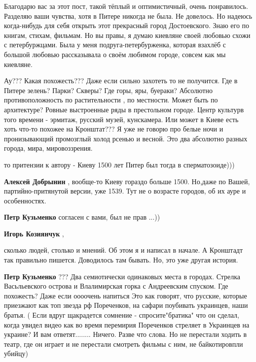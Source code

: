 \begin{itemize}
\begin{itemize}
\end{itemize} %


Благодарю вас за этот пост, такой тёплый и оптимистичный, очень понравилось.
Разделяю ваши чувства, хотя в Питере никогда не была. Не довелось. Но надеюсь
когда-нибудь для себя открыть этот прекрасный город Достоевского. Знаю его по
книгам, стихам, фильмам. Но вы правы, я думаю киевляне своей любовью схожи с
петербуржцами. Была у меня подруга-петербурженка, которая взахлёб с большой
любовью рассказывала о своём любимом городе, совсем как мы киевляне.


Ау??? Какая похожесть??? Даже если сильно захотеть то не получится. Где в
Питере зелень? Парки? Скверы? Где горы, яры, буераки? Абсолютно
противоположность по растительности , по местности. Может быть по архитектуре?
Ровные выстроенные ряды в престольном городе. Центр культурв того времени -
эрмитаж, русский музей, кунскамера. Или может в Киеве есть хоть что-то похожее
на Кронштат??? Я уже не говорю про белые ночи и пронизывающий промозглый холод
рсенью и весной. Это два абсолютно разных города, мира, мировоззрения.

\begin{itemize} %
то притензии к автору - Киеву 1500 лет Питер был тогда в сперматозоиде)))

\begin{itemize} %
\textbf{Алексей Добрынин} , вообще-то Киеву гораздо больше 1500. Но,даже по Вашей, партийно-притянутой версии, уже 1539. Тут не о возрасте городов, об их ауре и особенностях.

\textbf{Петр Кузьменко} согласен с вами, был не прав ...))
\end{itemize} %

\textbf{Игорь Козиянчук} , 

сколько людей, столько и мнений. Об этом я и написал в начале. А Кронштадт так
правильно пишется. Доводилось там бывать. Но, это уже другая история.

\begin{itemize} %
\textbf{Петр Кузьменко} ??? Два семиотически одинаковых места в городах. Стрелка Васьльевского острова и Влалимирская горка с Андреевским спуском. Где похожесть? Даже если оооочень напиться
Это как говорят, что русские, которые приезжают как топ звезда рф Пореченков, на сафари поубивать украинцев, наши братья. ( Если вдруг щакрадется сомнение - спросите"братика" что он сделал, когда увидел видео как во время перемирия Пореченков стреляет в Украинцев на украине? И вам ответят........ Ничего. Разве что слова. Но не перестали ходить в театр, где он играет и не перестали смотреть фильмы с ним, не байкотировпли убийцу)


\end{itemize}
\end{itemize}
\end{itemize}
